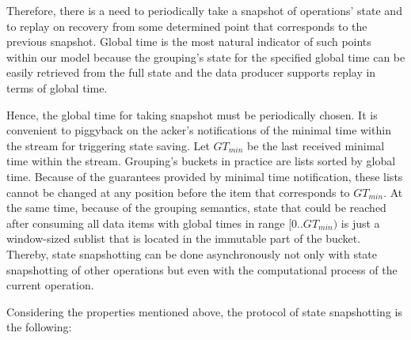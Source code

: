 Therefore, there is a need to periodically take a snapshot of operations' state and to replay on recovery from some determined point that corresponds to the previous snapshot. Global time is the most natural indicator of such points within our model because the grouping's state for the specified global time can be easily retrieved from the full state and the data producer supports replay in terms of global time.   

Hence, the global time for taking snapshot must be periodically chosen. It is convenient to piggyback on the acker's notifications of the minimal time within the stream for triggering state saving. Let $GT_{min}$ be the last received minimal time within the stream. Grouping's buckets in practice are lists sorted by global time. Because of the guarantees provided by minimal time notification, these lists cannot be changed at any position before the item that corresponds to $GT_{min}$. At the same time, because of the grouping semantics, state that could be reached after consuming all data items with global times in range $[0..GT_{min})$ is just a window-sized sublist that is located in the immutable part of the bucket. Thereby, state snapshotting can be done asynchronously not only with state snapshotting of other operations but even with the computational process of the current operation. 

Considering the properties mentioned above, the protocol of state snapshotting is the following:

